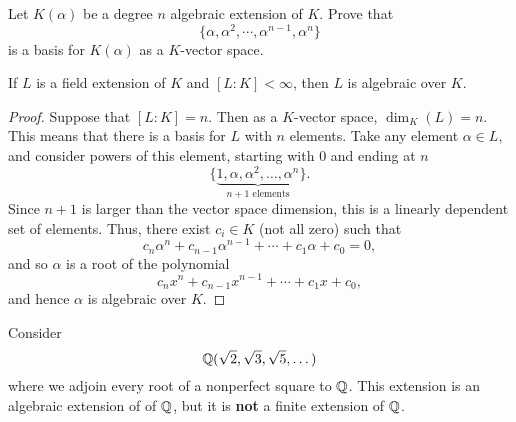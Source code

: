 \documentclass{ximera}
\begin{document}
\begin{exercise}
  Let $K(\alpha)$ be a degree $n$ algebraic extension of
  $K$. Prove that
  \[
  \{\alpha,\alpha^2, \cdots, \alpha^{n-1},\alpha^n\}
  \]
  is a basis for $K(\alpha)$ as a $K$-vector space.
\end{exercise}




\begin{theorem}\label{T:fea}
  If $L$ is a field extension of $K$ and $[L:K]<\infty$, then $L$ is
  algebraic over $K$.
  \begin{proof}
    Suppose that $[L:K]=n$. Then as a $K$-vector space, $\dim_K(L) =
    n$. This means that there is a basis for $L$ with $n$
    elements. Take any element $\alpha\in L$, and consider powers of
    this element, starting with $0$ and ending at $n$
    \[
    \{ \underbrace{1, \alpha, \alpha^2 ,\dots, \alpha^n}_{\text{$n+1$ elements}}\}.
    \]
    Since $n+1$ is larger than the vector space dimension, this is a
    linearly dependent set of elements. Thus, there exist $c_i\in K$
    (not all zero) such that
    \[
    c_n\alpha^n + c_{n-1}\alpha^{n-1} + \cdots + c_1\alpha + c_0 = 0,
    \]
    and so $\alpha$ is a root of the polynomial
    \[
    c_n x^n + c_{n-1}x^{n-1} + \cdots + c_1 x + c_0,
    \]
    and hence $\alpha$ is algebraic over $K$.
  \end{proof}
\end{theorem}



\begin{warning}
  Consider
  \[
  \mathbb Q(\sqrt{2},\sqrt{3},\sqrt{5},\dots)
  \]
  where we adjoin every root of a nonperfect square to $\mathbb Q$. This
  extension is an algebraic extension of of $\mathbb Q$, but it is
  \textbf{not} a finite extension of $\mathbb Q$.
\end{warning}
\end{document}

